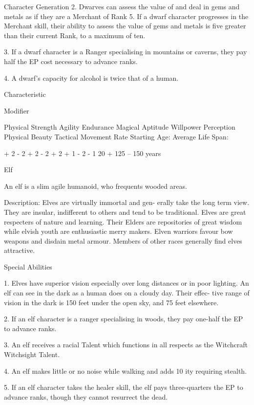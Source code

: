\begin{Chapter}{Character Generation}
2.  Dwarves  can  assess  the  value  of  and  deal  in 
gems and metals as if they are a Merchant of Rank 
5.  If  a  dwarf  character  progresses  in  the  Merchant 
skill,  their  ability  to  assess  the  value  of  gems  and 
metals  is  five  greater  than their  current Rank,  to a 
maximum of ten. 

3.  If  a  dwarf  character  is  a  Ranger  specialising  in 
mountains  or  caverns,  they  pay  half  the  EP  cost 
necessary to advance ranks. 

4. A dwarf’s capacity for alcohol is twice that of a 
human. 

Characteristic 

Modifier 

Physical Strength 
Agility 
Endurance 
Magical Aptitude 
Willpower 
Perception 
Physical Beauty 
Tactical Movement Rate 
Starting Age: 
Average Life Span: 

+ 2 
- 2 
+ 2 
- 2 
+ 2 
+ 1 
- 2 
- 1 
20 +  
125 – 150 years 

Elf 

An  elf  is  a  slim  agile  humanoid,  who  frequents 
wooded areas. 

Description: Elves are virtually immortal and gen-
erally  take  the  long  term  view.  They  are  insular, 
indifferent  to  others  and  tend  to  be  traditional. 
Elves  are  great  respecters  of  nature  and  learning. 
Their Elders are repositories of great wisdom while 
elvish  youth  are  enthusiastic  merry  makers.  Elven 
warriors  favour  bow  weapons  and  disdain  metal 
armour.  Members  of  other  races  generally  find 
elves attractive. 

Special Abilities 

1.  Elves  have  superior  vision  especially  over  long 
distances or in poor lighting. An elf can see in the 
dark as a human does on a cloudy day. Their effec-
tive  range  of  vision  in  the  dark  is  150  feet  under 
the open sky, and 75 feet elsewhere. 

2.  If  an  elf  character  is  a  ranger  specialising  in 
woods, they pay one-half the EP to advance ranks. 

3.  An  elf  receives  a  racial  Talent  which  functions 
in all respects as the Witchcraft Witchsight Talent. 

4.  An  elf  makes  little  or  no  noise  while  walking 
and adds 10%
ity requiring stealth. 

5.  If  an  elf  character  takes  the  healer  skill,  the  elf 
pays  three-quarters  the  EP  to  advance  ranks, 
though they cannot resurrect the dead. 


\end{Chapter}
